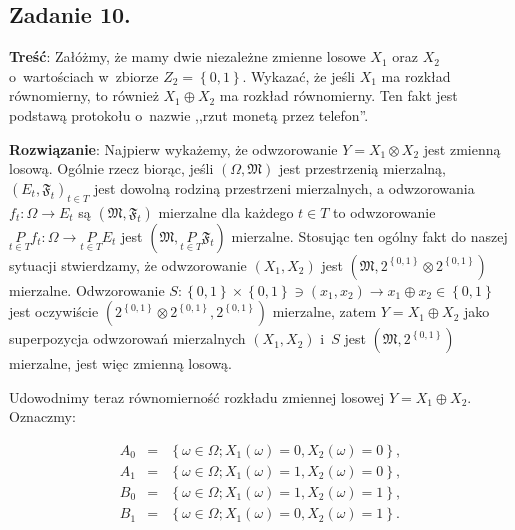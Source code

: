 \documentclass[a4paper,10pt, twocolumn]{article}
\begin{document}
\subsection{Zadanie 10.}
\label{subsec:KolZadanie10}

\textbf{Treść}: Załóżmy, że mamy dwie niezależne zmienne losowe $X_{1}$ oraz $X_{2}$ o~wartościach w~zbiorze $Z_{2} = \left\{0, 1\right\}$. Wykazać, że jeśli $X_{1}$ ma rozkład równomierny, to również $X_{1} \oplus X_{2}$ ma rozkład równomierny. Ten fakt jest podstawą protokołu o~nazwie ,,rzut monetą przez telefon''.

\textbf{Rozwiązanie}: Najpierw wykażemy, że odwzorowanie $Y = X_{1} \otimes X_{2}$ jest zmienną losową. Ogólnie rzecz biorąc, jeśli $(\Omega, \mathfrak{M})$ jest przestrzenią mierzalną, $(E_{t}, \mathfrak{F}_{t})_{t \in T}$ jest dowolną rodziną przestrzeni mierzalnych, a odwzorowania $f_{t}: \Omega \rightarrow E_{t}$ są $(\mathfrak{M}, \mathfrak{F}_{t})$ mierzalne dla każdego $t \in T$ to odwzorowanie $\underset{t \in T}{P} f_{t}: \Omega \rightarrow \underset{t \in T}{P} E_{t}$ jest $(\mathfrak{M}, \underset{t \in T}{P} \mathfrak{F}_{t})$ mierzalne. Stosując ten ogólny fakt do naszej sytuacji stwierdzamy, że odwzorowanie $(X_{1}, X_{2})$ jest $(\mathfrak{M}, 2^{\left\{0,1\right\}} \otimes  2^{\left\{0,1\right\}})$ mierzalne. Odwzorowanie $S: \left\{0,1\right\} \times \left\{0,1\right\} \ni (x_{1}, x_{2}) \rightarrow x_{1} \oplus x_{2} \in \left\{0,1\right\}$ jest oczywiście $(2^{\left\{0,1\right\}} \otimes  2^{\left\{0,1\right\}},  2^{\left\{0,1\right\}})$ mierzalne, zatem $Y = X_{1} \oplus X_{2}$ jako superpozycja odwzorowań mierzalnych $(X_{1}, X_{2})$ i~$S$ jest $(\mathfrak{M},  2^{\left\{0,1\right\}})$ mierzalne, jest więc zmienną losową.

Udowodnimy teraz równomierność rozkładu zmiennej losowej $Y = X_{1} \oplus X_{2}$. Oznaczmy: 

\begin{equation*}
	\begin{array}{lcl} A_{0} & = & \left\{\omega \in \Omega; X_{1}(\omega) = 0, X_{2}(\omega) = 0 \right\}, \\ A_{1} & = & \left\{\omega \in \Omega; X_{1}(\omega) = 1, X_{2}(\omega) = 0 \right\}, \\ B_{0} & = & \left\{\omega \in \Omega; X_{1}(\omega) = 1, X_{2}(\omega) = 1 \right\}, \\ B_{1} & = & \left\{\omega \in \Omega; X_{1}(\omega) = 0, X_{2}(\omega) = 1 \right\}. \\\end{array}
\end{equation*}
\end{document}
